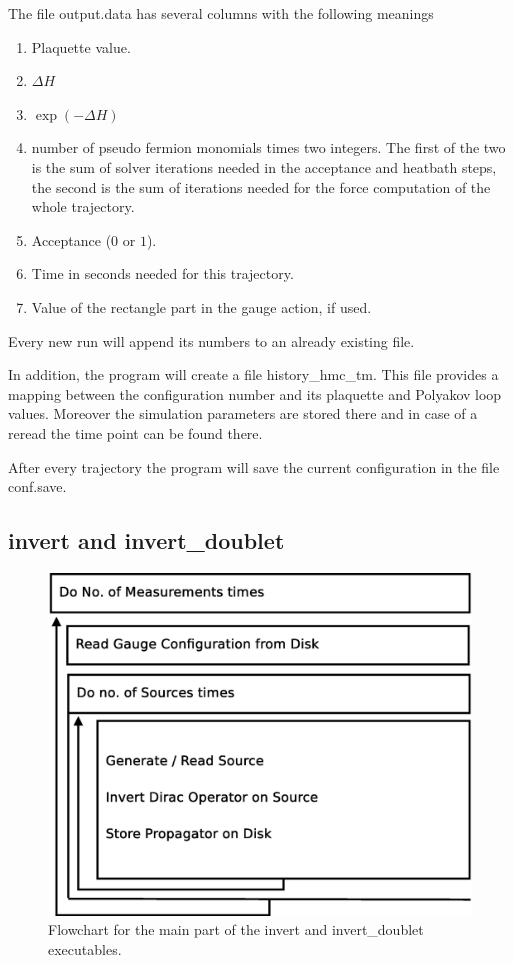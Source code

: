 The file {\ttfamily output.data} has several columns with the
following meanings
\begin{enumerate}
\item Plaquette value.
\item $\Delta H$
\item $\exp(-\Delta H)$
\item number of pseudo fermion monomials times two integers. The first
  of the two is the sum of solver iterations needed
  in the acceptance and heatbath steps, the second is the sum of 
  iterations needed for the force computation of the whole trajectory.
\item Acceptance ($0$ or $1$).
\item Time in seconds needed for this trajectory.
\item Value of the rectangle part in the gauge action, if used.
\end{enumerate}
Every new run will append its numbers to an already existing file.

In addition, the program will create a file {\ttfamily
  history\_hmc\_tm}. This file provides a mapping between the
configuration number and its plaquette and Polyakov loop
values. Moreover the simulation parameters are stored there and in
case of a reread the time point can be found there.

After every trajectory the program will save the current configuration
in the file {\ttfamily conf.save}.

\subsection{{\ttfamily invert} and {\ttfamily invert\_doublet}}

\begin{figure}[t]
  \centering
  \includegraphics[width=0.7\linewidth]{invertflow.eps}
  \caption{Flowchart for the main part of the {\ttfamily invert} and
    {\ttfamily invert\_doublet} executables.}
  \label{fig:invertflow}
\end{figure}

